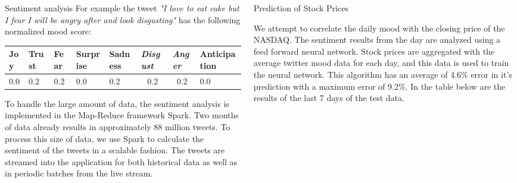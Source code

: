 \documentclass[final,table]{beamer}
\newlength{\twocolwid}
\begin{document}
\begin{frame}[t]
\begin{columns}[t]
\begin{column}{\twocolwid}
\begin{block}{Sentiment analysis}
\vspace{1em}
For example the tweet \emph{"I love to eat cake but I fear I will be angry after and look disgusting"} has the following normalized mood score: \vspace{1em}
\begin{table}[ht!]
\begin{tabular}{|l|l|l|l|l|l|l|l|}
\hline
\textbf{Joy} & \textbf{Trust} & \textbf{Fear} & \textbf{Surprise} & \textbf{Sadness} & \textit{\textbf{Disgust}} & \textit{\textbf{Anger}}  & \textbf{Anticipation} \\ \hline
0.0          & 0.2            & 0.2           & 0.0               & 0.2              & \multicolumn{1}{c|}{0.2}  & \multicolumn{1}{c|}{0.2} &          0.0             \\ \hline
\end{tabular}
\end{table}






\vspace{2em}

To handle the large amount of data, the sentiment analysis is implemented in the Map-Reduce framework Spark. Two months of data already results in approximately 88 million tweets. To process this size of data, we use Spark to calculate the sentiment of the tweets in a scalable fashion. The tweets are streamed into the application for both historical data as well as in periodic batches from the live stream.
    
    
\end{block}
\end{column}
\begin{column}{\twocolwid} %

\begin{block}{Prediction of Stock Prices}

We attempt to correlate the daily mood with the closing price of the NASDAQ. The sentiment results from the day are analyzed using a feed forward neural network. Stock prices are aggregated with the average twitter mood data for each day, and this data is used to train the neural network. This algorithm has an average of 4.6\% error in it's prediction with a maximum error of 9.2\%. In the table below are the results of the last 7 days of the test data.


\end{block}
\end{column}
\end{columns}
\end{frame}
\end{document}
